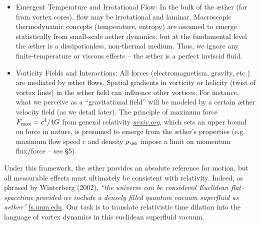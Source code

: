 \begin{itemize}
    \item
    Emergent Temperature and Irrotational Flow: In the bulk of the æther (far from vortex cores), flow may be irrotational and laminar. Macroscopic thermodynamic concepts (temperature, entropy) are assumed to emerge statistically from small-scale aether dynamics, but at the fundamental level the æther is a dissipationless, non-thermal medium. Thus, we ignore any finite-temperature or viscous effects – the æther is a perfect inviscid fluid.

    \item
    Vorticity Fields and Interactions: All forces (electromagnetism, gravity, etc.) are mediated by æther flows. Spatial gradients in vorticity or helicity (twist of vortex lines) in the æther field can influence other vortices. For instance, what we perceive as a “gravitational field” will be modeled by a certain æther velocity field (as we detail later). The principle of maximum force $F_{\rm max}=c^4/4G$ from general relativity
    \href{https://arxiv.org/abs/2205.06302#:~:text=the%20principle%20of%20maximum%20force,The%20limits%20illuminate}{\textit{arxiv.org}}, which sets an upper bound on force in nature, is presumed to emerge from the æther’s properties (e.g. maximum flow speed $c$ and density $\rho_{\Ae}$ impose a limit on momentum flux/force – see §5).
\end{itemize}

Under this framework, the æther provides an absolute reference for motion, but all measurable effects must ultimately be consistent with relativity. Indeed, as phrased by Winterberg (2002), \textit{“the universe can be considered Euclidean flat-spacetime provided we include a densely filled quantum vacuum superfluid as aether”}
\href{https://fs.unm.edu/QuantizationDiscretization.pdf#:~:text=Winterberg%20,an%20equal%20number%20of%20positive}{fs.unm.edu}. Our task is to translate relativistic time dilation into the language of vortex dynamics in this euclidean superfluid vacuum.

